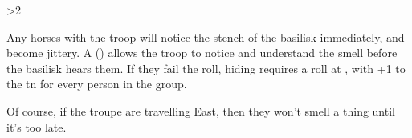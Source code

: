 \ifnum\value{temperature}>2

Any horses with the troop will notice the stench of the \gls{basilisk} immediately, and become jittery.
A  (\tn[10]) allows the troop to notice and understand the smell before the \gls{basilisk} hears them.
If they fail the roll, hiding requires a  roll at \tn[10], with +1 to the \gls{tn} for every person in the group.

Of course, if the troupe are travelling East, then they won't smell a thing until it's too late.

\basilisk

\fi
